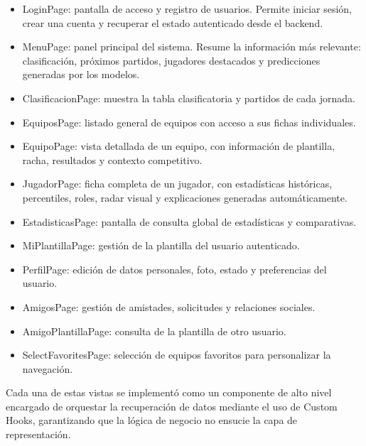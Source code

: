 \begin{itemize}
\item LoginPage: pantalla de acceso y registro de usuarios. Permite iniciar sesión, crear una cuenta y recuperar el estado autenticado desde el backend.

\item MenuPage: panel principal del sistema. Resume la información más relevante: clasificación, próximos partidos, jugadores destacados y predicciones generadas por los modelos.

\item ClasificacionPage: muestra la tabla clasificatoria y partidos de cada jornada.

\item EquiposPage: listado general de equipos con acceso a sus fichas individuales.

\item EquipoPage: vista detallada de un equipo, con información de plantilla, racha, resultados y contexto competitivo.

\item JugadorPage: ficha completa de un jugador, con estadísticas históricas, percentiles, roles, radar visual y explicaciones generadas automáticamente.

\item EstadisticasPage: pantalla de consulta global de estadísticas y comparativas.

\item MiPlantillaPage: gestión de la plantilla del usuario autenticado.

\item PerfilPage: edición de datos personales, foto, estado y preferencias del usuario.

\item AmigosPage: gestión de amistades, solicitudes y relaciones sociales.

\item AmigoPlantillaPage: consulta de la plantilla de otro usuario.

\item SelectFavoritesPage: selección de equipos favoritos para personalizar la navegación.
\end{itemize}

Cada una de estas vistas se implementó como un componente de alto nivel encargado de orquestar la recuperación de datos mediante el uso de Custom Hooks,
 garantizando que la lógica de negocio no ensucie la capa de representación.

